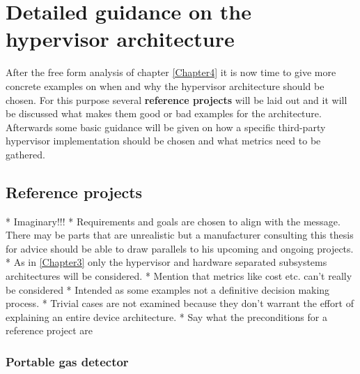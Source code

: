 
\chapter{Detailed guidance on the hypervisor architecture} %

\label{Chapter5} %


\newcommand{\keyword}[1]{\textbf{#1}}
\newcommand{\tabhead}[1]{\textbf{#1}}
\newcommand{\code}[1]{\texttt{#1}}
\newcommand{\file}[1]{\texttt{\bfseries#1}}
\newcommand{\option}[1]{\texttt{\itshape#1}}

After the free form analysis of chapter \ref{Chapter4} it is now time to give more concrete examples on when and why the hypervisor architecture should be chosen. For this purpose several \keyword{reference projects} will be laid out and it will be discussed what makes them good or bad examples for the architecture. Afterwards some basic guidance will be given on how a specific third-party hypervisor implementation should be chosen and what metrics need to be gathered.
\section{Reference projects}
* Imaginary!!!
* Requirements and goals are chosen to align with the message. There may be parts that are unrealistic but a manufacturer consulting this thesis for advice should be able to draw parallels to his upcoming and ongoing projects. 
*  As in \ref{Chapter3} only the hypervisor and hardware separated subsystems architectures will be considered. 
* Mention that metrics like cost etc. can't really be considered
* Intended as some examples not a definitive decision making process.
* Trivial cases are not examined because they don't warrant the effort of explaining an entire device architecture.
* Say what the preconditions for a reference project are
\subsection{Portable gas detector}
